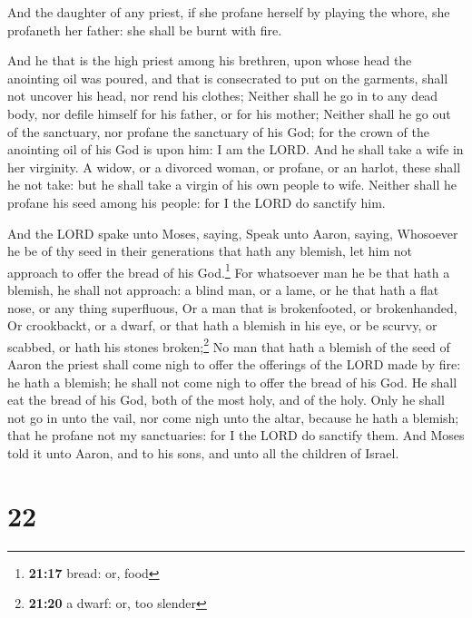  And the daughter of any priest, if she profane herself by
playing the whore, she profaneth her father: she shall be burnt with
fire.

 And he that is the high priest among his brethren, upon
whose head the anointing oil was poured, and that is consecrated to put
on the garments, shall not uncover his head, nor rend his clothes;
 Neither shall he go in to any dead body, nor defile
himself for his father, or for his mother;  Neither shall
he go out of the sanctuary, nor profane the sanctuary of his God; for
the crown of the anointing oil of his God is upon him: I am the LORD.
 And he shall take a wife in her virginity.
 A widow, or a divorced woman, or profane, or an harlot,
these shall he not take: but he shall take a virgin of his own people to
wife.  Neither shall he profane his seed among his
people: for I the LORD do sanctify him.

 And the LORD spake unto Moses, saying, 
Speak unto Aaron, saying, Whosoever he be of thy seed in their
generations that hath any blemish, let him not approach to offer the
bread of his God.\footnote{\textbf{21:17} bread: or, food}
 For whatsoever man he be that hath a blemish, he shall
not approach: a blind man, or a lame, or he that hath a flat nose, or
any thing superfluous,  Or a man that is brokenfooted, or
brokenhanded,  Or crookbackt, or a dwarf, or that hath a
blemish in his eye, or be scurvy, or scabbed, or hath his stones
broken;\footnote{\textbf{21:20} a dwarf: or, too slender}
 No man that hath a blemish of the seed of Aaron the
priest shall come nigh to offer the offerings of the LORD made by fire:
he hath a blemish; he shall not come nigh to offer the bread of his God.
 He shall eat the bread of his God, both of the most
holy, and of the holy.  Only he shall not go in unto the
vail, nor come nigh unto the altar, because he hath a blemish; that he
profane not my sanctuaries: for I the LORD do sanctify them.
 And Moses told it unto Aaron, and to his sons, and unto
all the children of Israel.

\hypertarget{section-21}{%
\section{22}\label{section-21}}

